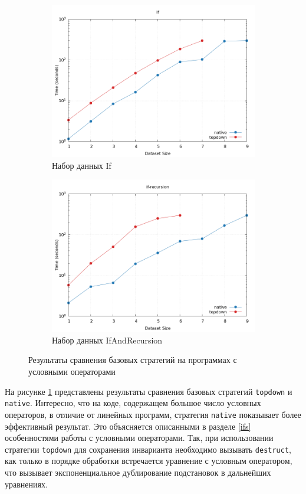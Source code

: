 \documentclass[../thesis.tex]{subfiles}
\begin{document}
\begin{figure}[h]
    \begin{subfigure}{0.5\textwidth}
    \includegraphics[width=\linewidth]{basic_if.png} 
    \caption{Набор данных If}
    \end{subfigure}
    \begin{subfigure}{0.5\textwidth}
    \includegraphics[width=\linewidth]{basic_ifrec.png}
    \caption{Набор данных IfAndRecursion}
    \end{subfigure}
    \caption{Результаты сравнения базовых стратегий на программах с условными операторами}
    \label{basic_ifs}
\end{figure}

На рисунке \ref{basic_ifs} представлены результаты сравнения базовых стратегий \texttt{topdown} и \texttt{native}. Интересно, что на коде, содержащем большое число условных операторов, в отличие от линейных программ, стратегия \texttt{native} показывает более эффективный результат. Это объясняется описанными в разделе \ref{ifs} особенностями работы с условными операторами. Так, при использовании стратегии \texttt{topdown} для сохранения инварианта необходимо вызывать \texttt{destruct}, как только в порядке обработки встречается уравнение с условным оператором, что вызывает экспоненциальное дублирование подстановок в дальнейших уравнениях. 
\end{document}
